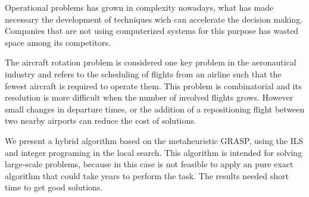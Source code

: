 \documentclass[oneside,normaltoc,espacoumemeio,PGTEXdissertacao]{pgeeltex}
\begin{document}
\begin{abstractPGTEX}
Operational problems has grown in complexity nowadays, what has made
necessary the development of techniques wich can accelerate the decision
making. Companies that are not using computerized systems for this purpose has
wasted space among its competitors.

The aircraft rotation problem is considered one key problem in the
aeronautical industry and refers to the scheduling of flights from an
airline such that the fewest aircraft is required to operate them. This problem
is combinatorial and its resolution is more difficult when the number of
involved flights grows. However small changes in departure times, or the
addition of a repositioning flight between two nearby airports can
reduce the cost of solutions.

We present a hybrid algorithm based on the metaheuristic GRASP, using the ILS
and integer programing in the local search. This algorithm is intended for
solving large-scale problems, because in this case is not feasible to apply an pure
exact algorithm that could take years to perform the task. 
The results needed short time to get good solutions.

\end{abstractPGTEX}


\listadefiguras

\listadetabelas

\listadesiglas


\sumario
  






  

%

 




\anexo







  
\end{document}
